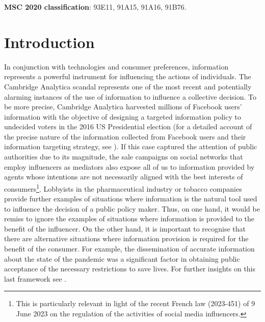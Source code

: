 \documentclass[a4paper,10pt]{article}
\theoremstyle{definition}
\theoremstyle{plain}
\numberwithin{equation}{section}
\begin{document}
{\bf MSC 2020 classification}: 93E11, 91A15, 91A16, 91B76. 



\section{Introduction}
In conjunction with technologies and consumer preferences, information represents a powerful instrument for influencing the actions of individuals. The Cambridge Analytica scandal represents one of the most recent and potentially alarming instances of the use of information to influence a collective decision. To be more precise, Cambridge Analytica harvested millions of Facebook users' information with the objective of designing a targeted information policy to undecided voters in the 2016 US Presidential election (for a detailed account of the precise nature of the information collected from Facebook users and their information targeting strategy, see \cite{Rehman19}). If this case captured the attention of public authorities due to its magnitude, the sale campaigns on social networks that employ influencers as mediators also expose all of us to information provided by agents whose intentions are not necessarily aligned with the best interests of consumers\footnote{This is particularly relevant in light of the recent French law (2023-451) of 9 June 2023 on the regulation of the activities of social media influencers.}. Lobbyists in the pharmaceutical industry or tobacco companies provide further examples of situations where information is the natural tool used to influence the decision of a public policy maker. Thus, on one hand, it would be remiss to ignore the examples of situations where information is provided to the benefit of the influencer. On the other hand, it is important to recognise that there are alternative situations where information provision is required for the benefit of the consumer. For example, the dissemination of accurate information about the state of the pandemic was a significant factor in obtaining public acceptance of the necessary restrictions to save lives. For further insights on this last framework see  \cite{Pathak22}. 
\end{document}
